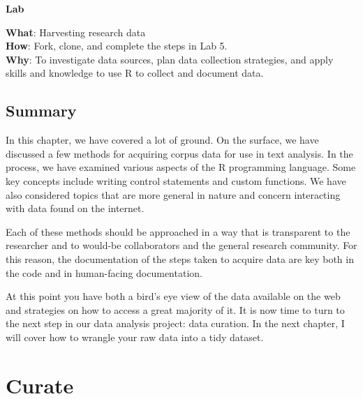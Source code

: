 \documentclass[
  letterpaper,
  krantz1]{latex/krantz-mod}
\newcommand{\setDOI}[1]{\gdef\doi{#1}}
\theoremstyle{definition}
\theoremstyle{definition}
\theoremstyle{remark}
\begin{document}
\begin{tcolorbox}[enhanced jigsaw, leftrule=.75mm, colframe=quarto-callout-color-frame, left=2mm, colback=white, toprule=.15mm, breakable, arc=.35mm, opacityback=0, bottomrule=.15mm, rightrule=.15mm]

\textbf{ Lab}

\textbf{What}: Harvesting research data\\
\textbf{How}: Fork, clone, and complete the steps in Lab 5.\\
\textbf{Why}: To investigate data sources, plan data collection
strategies, and apply skills and knowledge to use R to collect and
document data.

\end{tcolorbox}

\section*{Summary}\label{summary-4}


In this chapter, we have covered a lot of ground. On the surface, we
have discussed a few methods for acquiring corpus data for use in text
analysis. In the process, we have examined various aspects of the R
programming language. Some key concepts include writing control
statements and custom functions. We have also considered topics that are
more general in nature and concern interacting with data found on the
internet.

Each of these methods should be approached in a way that is transparent
to the researcher and to would-be collaborators and the general research
community. For this reason, the documentation of the steps taken to
acquire data are key both in the code and in human-facing documentation.

At this point you have both a bird's eye view of the data available on
the web and strategies on how to access a great majority of it. It is
now time to turn to the next step in our data analysis project: data
curation. In the next chapter, I will cover how to wrangle your raw data
into a tidy dataset.

\chapter{Curate}\label{sec-curate-chapter}

\setDOI{10.4324/9781003393764.6}
\thispagestyle{chapterfirstpage}
\end{document}
